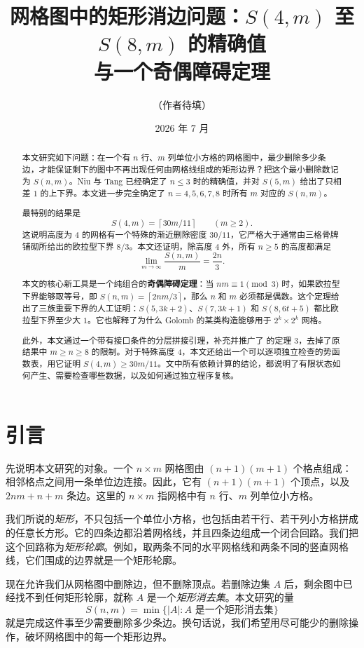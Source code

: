 \documentclass[11pt]{ctexart}
\title{网格图中的矩形消边问题：$S(4,m)$ 至 $S(8,m)$ 的精确值\\与一个奇偶障碍定理}
\author{（作者待填）}
\date{2026 年 7 月}
\theoremstyle{definition}
\newcommand{\ceil}[1]{\left\lceil #1 \right\rceil}
\begin{document}
\maketitle

\begin{abstract}
本文研究如下问题：在一个有 $n$ 行、$m$ 列单位小方格的网格图中，最少删除多少条边，才能保证剩下的图中不再出现任何由网格线组成的矩形边界？把这个最小删除数记为 $S(n,m)$。Niu 与 Tang \cite{NT25} 已经确定了 $n\le 3$ 时的精确值，并对 $S(5,m)$ 给出了只相差 $1$ 的上下界。本文进一步完全确定了 $n=4,5,6,7,8$ 时所有 $m$ 对应的 $S(n,m)$。

最特别的结果是
\[
S(4,m)=\ceil{30m/11}\qquad(m\ge2).
\]
这说明高度为 $4$ 的网格有一个特殊的渐近删除密度 $30/11$，它严格大于通常由三格骨牌铺砌所给出的欧拉型下界 $8/3$。本文还证明，除高度 $4$ 外，所有 $n\ge5$ 的高度都满足
\[
\lim_{m\to\infty}\frac{S(n,m)}m=\frac{2n}{3}.
\]

本文的核心新工具是一个纯组合的\textbf{奇偶障碍定理}：当 $nm\equiv1\pmod3$ 时，如果欧拉型下界能够取等号，即
$S(n,m)=\ceil{2nm/3}$，那么 $n$ 和 $m$ 必须都是偶数。这个定理给出了三族重要下界的人工证明：$S(5,3k+2)$、$S(7,3k+1)$ 和 $S(8,6t+5)$ 都比欧拉型下界至少大 $1$。它也解释了为什么 Golomb 的某类构造能够用于 $2^k\times2^k$ 网格。

此外，本文通过一个带有接口条件的分层拼接引理，补充并推广了 \cite{NT25} 的定理 3，去掉了原结果中 $m\ge n\ge8$ 的限制。对于特殊高度 $4$，本文还给出一个可以逐项独立检查的势函数表，用它证明
$S(4,m)\ge30m/11$。文中所有依赖计算的结论，都说明了有限状态如何产生、需要检查哪些数据，以及如何通过独立程序复核。
\end{abstract}

\section{引言}

先说明本文研究的对象。一个 $n\times m$ 网格图由 $(n+1)(m+1)$ 个格点组成：相邻格点之间用一条单位边连接。因此，它有 $(n+1)(m+1)$ 个顶点，以及 $2nm+n+m$ 条边。这里的 $n\times m$ 指网格中有 $n$ 行、$m$ 列单位小方格。

我们所说的\emph{矩形}，不只包括一个单位小方格，也包括由若干行、若干列小方格拼成的任意长方形。它的四条边都沿着网格线，并且四条边组成一个闭合回路。我们把这个回路称为\emph{矩形轮廓}。例如，取两条不同的水平网格线和两条不同的竖直网格线，它们围成的边界就是一个矩形轮廓。

现在允许我们从网格图中删除边，但不删除顶点。若删除边集 $A$ 后，剩余图中已经找不到任何矩形轮廓，就称 $A$ 是一个\emph{矩形消去集}。本文研究的量
\[
S(n,m)=\min\{|A|: A\text{ 是一个矩形消去集}\}
\]
就是完成这件事至少需要删除多少条边。换句话说，我们希望用尽可能少的删除操作，破坏网格图中的每一个矩形边界。
\end{document}
